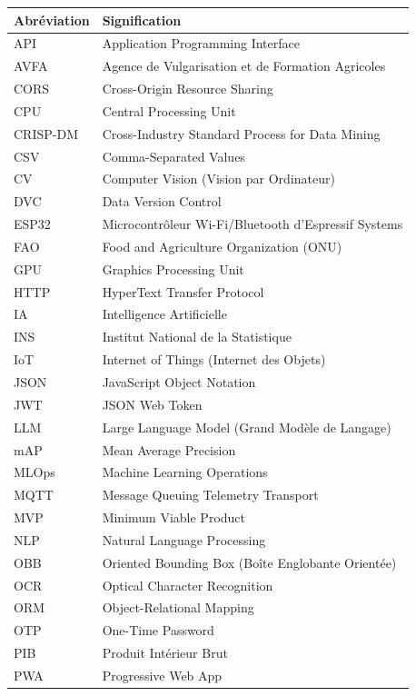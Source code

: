 \begin{longtable}{@{}lp{10cm}@{}}
\toprule
\textbf{Abréviation} & \textbf{Signification} \\
\midrule
\endhead
\bottomrule
\endfoot
API     & Application Programming Interface \\
AVFA    & Agence de Vulgarisation et de Formation Agricoles \\
CORS    & Cross-Origin Resource Sharing \\
CPU     & Central Processing Unit \\
CRISP-DM & Cross-Industry Standard Process for Data Mining \\
CSV     & Comma-Separated Values \\
CV      & Computer Vision (Vision par Ordinateur) \\
DVC     & Data Version Control \\
ESP32   & Microcontrôleur Wi-Fi/Bluetooth d'Espressif Systems \\
FAO     & Food and Agriculture Organization (ONU) \\
GPU     & Graphics Processing Unit \\
HTTP    & HyperText Transfer Protocol \\
IA      & Intelligence Artificielle \\
INS     & Institut National de la Statistique \\
IoT     & Internet of Things (Internet des Objets) \\
JSON    & JavaScript Object Notation \\
JWT     & JSON Web Token \\
LLM     & Large Language Model (Grand Modèle de Langage) \\
mAP     & Mean Average Precision \\
MLOps   & Machine Learning Operations \\
MQTT    & Message Queuing Telemetry Transport \\
MVP     & Minimum Viable Product \\
NLP     & Natural Language Processing \\
OBB     & Oriented Bounding Box (Boîte Englobante Orientée) \\
OCR     & Optical Character Recognition \\
ORM     & Object-Relational Mapping \\
OTP     & One-Time Password \\
PIB     & Produit Intérieur Brut \\
PWA     & Progressive Web App \\

\end{longtable}
